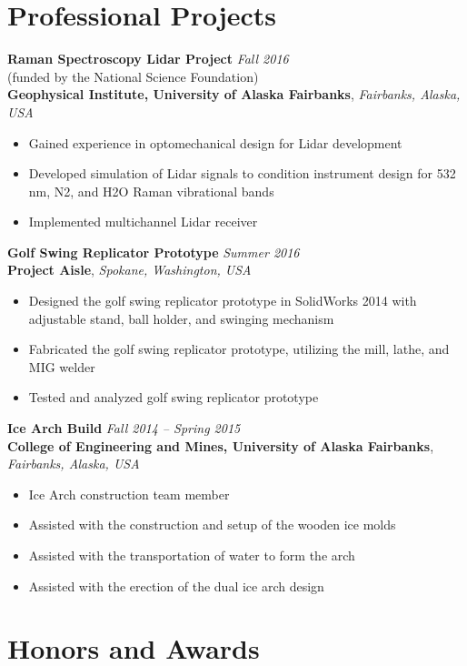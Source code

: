 \documentclass[12pt,a4paper]{article}
\begin{document}
\section*{Professional Projects}

\textbf{Raman Spectroscopy Lidar Project} \textit{Fall 2016}\\
(funded by the National Science Foundation)\\
\textbf{Geophysical Institute, University of Alaska Fairbanks}, \textit{Fairbanks, Alaska, USA}
\begin{itemize}
\item Gained experience in optomechanical design for Lidar development
\item Developed simulation of Lidar signals to condition instrument design for 532 nm, N2, and
H2O Raman vibrational bands
\item Implemented multichannel Lidar receiver
\end{itemize}

\textbf{Golf Swing Replicator Prototype} \textit{Summer 2016}\\
\textbf{Project Aisle}, \textit{Spokane, Washington, USA}
\begin{itemize}
\item Designed the golf swing replicator prototype in SolidWorks 2014 with adjustable stand, ball
holder, and swinging mechanism
\item Fabricated the golf swing replicator prototype, utilizing the mill, lathe, and MIG welder
\item Tested and analyzed golf swing replicator prototype
\end{itemize}

\textbf{Ice Arch Build} \textit{Fall 2014 – Spring 2015}\\
\textbf{College of Engineering and Mines, University of Alaska Fairbanks}, \textit{Fairbanks, Alaska, USA}
\begin{itemize}
\item Ice Arch construction team member
\item Assisted with the construction and setup of the wooden ice molds
\item Assisted with the transportation of water to form the arch
\item Assisted with the erection of the dual ice arch design
\end{itemize}

\section*{Honors and Awards}
\end{document}
